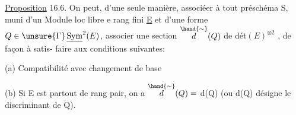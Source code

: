 \uline{Proposition} 16.6. On peut,  d'une seule manière, associéer à tout
préschéma S, muni d'un Module loc libre e rang fini \uline{E} et d'une forme 
$Q \in \unsure{\Gamma}\,\underline{\mathrm{Sym}}^2(E)$, associer une section $\overset{\hand{\sim}}{d}(Q)$ de dét$(E)^{\otimes 2}$ , de façon à satis-%
faire aux conditions suivantes:

(a) Compatibilité avec changement de base

(b) Si E est partout de rang pair, on a $\overset{\hand{\sim}}{d}(Q) =$ d(Q) (ou d(Q)
désigne le discriminant de Q).

